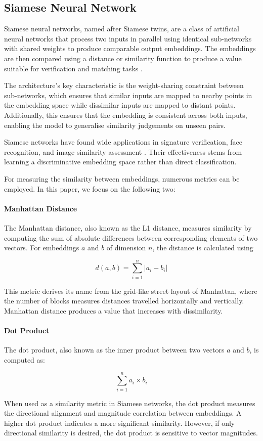 \subsection{Siamese Neural Network} \label{ML:SiameseNetwork}
Siamese neural networks, named after Siamese twins, are a class of artificial neural networks that process two inputs in parallel using identical sub-networks with shared weights to produce comparable output embeddings. The embeddings are then compared using a distance or similarity function to produce a value suitable for verification and matching tasks \cite{SiameseModelIntro}.

The architecture's key characteristic is the weight-sharing constraint between sub-networks, which ensures that similar inputs are mapped to nearby points in the embedding space while dissimilar inputs are mapped to distant points. Additionally, this ensures that the embedding is consistent across both inputs, enabling the model to generalise similarity judgements on unseen pairs.

Siamese networks have found wide applications in signature verification, face recognition, and image similarity assessment \cite{SiameseModelSignatureVerification, SiameseFacialRecognition, SiameseImageSimilarity} . Their effectiveness stems from learning a discriminative embedding space rather than direct classification.

For measuring the similarity between embeddings, numerous metrics can be employed. In this paper, we focus on the following two:

\paragraph{Manhattan Distance}
The Manhattan distance, also known as the L1 distance, measures similarity by computing the sum of absolute differences between corresponding elements of two vectors. For embeddings $a$ and $b$ of dimension $n$, the distance is calculated using

$$d(a, b) = \sum^n_{i=1}|a_i - b_i|$$

This metric derives its name from the grid-like street layout of Manhattan, where the number of blocks measures distances travelled horizontally and vertically. Manhattan distance produces a value that increases with dissimilarity.



\paragraph{Dot Product}
The dot product, also known as the inner product between two vectors $a$ and $b$, is computed as:

$$\sum^n_{i=1}a_i \times b_i$$

When used as a similarity metric in Siamese networks, the dot product measures the directional alignment and magnitude correlation between embeddings. A higher dot product indicates a more significant similarity. However, if only directional similarity is desired, the dot product is sensitive to vector magnitudes.

